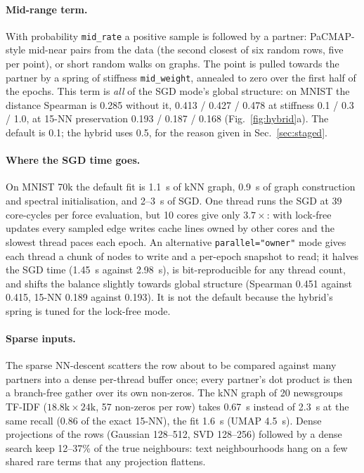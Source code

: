 \documentclass[11pt]{article}
\begin{document}
\paragraph{Mid-range term.} With probability \texttt{mid\_rate} a positive sample is followed by a
partner: PaCMAP-style mid-near pairs from the data \citep{wang2021pacmap} (the second closest of six
random rows, five per point), or short random walks on graphs. The point is pulled towards the partner
by a spring of stiffness \texttt{mid\_weight}, annealed to zero over the first half of the epochs. This
term is \emph{all} of the SGD mode's global structure: on MNIST the distance Spearman is 0.285 without
it, 0.413 / 0.427 / 0.478 at stiffness 0.1 / 0.3 / 1.0, at 15-NN preservation 0.193 / 0.187 / 0.168
(Fig.~\ref{fig:hybrid}a). The default is 0.1; the hybrid uses 0.5, for the reason given in
Sec.~\ref{sec:staged}.

\paragraph{Where the SGD time goes.} On MNIST 70k the default fit is 1.1~s of kNN graph, 0.9~s of graph
construction and spectral initialisation, and 2--3~s of SGD. One thread runs the SGD at 39 core-cycles
per force evaluation, but 10 cores give only $3.7\times$: with lock-free updates every sampled edge
writes cache lines owned by other cores and the slowest thread paces each epoch. An alternative
\texttt{parallel="owner"} mode gives each thread a chunk of nodes to write and a per-epoch snapshot to
read; it halves the SGD time (1.45~s against 2.98~s), is bit-reproducible for any thread count, and
shifts the balance slightly towards global structure (Spearman 0.451 against 0.415, 15-NN 0.189 against
0.193). It is not the default because the hybrid's spring is tuned for the lock-free mode.

\paragraph{Sparse inputs.} The sparse NN-descent scatters the row about to be compared against many
partners into a dense per-thread buffer once; every partner's dot product is then a branch-free gather
over its own non-zeros. The kNN graph of 20 newsgroups TF-IDF ($18.8\mathrm{k} \times 24\mathrm{k}$, 57
non-zeros per row) takes 0.67~s instead of 2.3~s at the same recall (0.86 of the exact 15-NN), the fit
1.6~s (UMAP 4.5~s). Dense projections of the rows (Gaussian 128--512, SVD 128--256) followed by a dense
search keep 12--37\% of the true neighbours: text neighbourhoods hang on a few shared rare terms that any
projection flattens.
\end{document}
